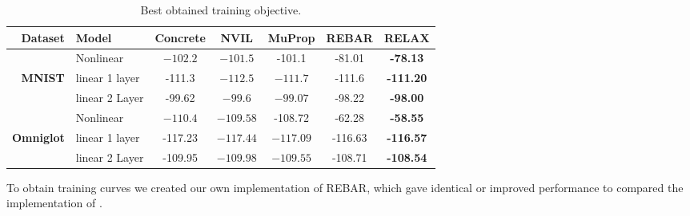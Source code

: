 \documentclass{article}
\newcommand{\E}{\mathbb{E}}
\newcommand{\PT}{\frac{\partial}{\partial \theta}}
\newcommand{\PP}[1]{\frac{\partial}{\partial #1}}
\begin{document}
\begin{table}[h]
\centering
\begin{tabular}{r l | c c c c c} 
Dataset & Model & Concrete & NVIL & MuProp  & REBAR & RELAX\\\midrule 
               & Nonlinear & $-102.2$ & $-101.5$ & -101.1  &  -81.01 &  \textbf{-78.13} \\
\textbf{MNIST} & linear 1 layer  &-111.3 & $-112.5$ & $-111.7$  & -111.6 & \textbf{-111.20} \\ 
               & linear 2 Layer  &-99.62 & $-99.6$ & $-99.07$   & -98.22 & \textbf{-98.00} \\
\midrule
               & Nonlinear  & $-110.4$  & $-109.58$ & -108.72  & -62.28 & \textbf{-58.55} \\
\textbf{Omniglot} & linear 1 layer &-117.23 & $-117.44$ & $-117.09$   & -116.63 & \textbf{-116.57} \\ 
                  & linear 2 Layer &-109.95 & $-109.98$ & $-109.55$  & -108.71 & \textbf{-108.54}
\end{tabular}
\caption{Best obtained training objective.}
\label{tab:vae tr}
\end{table}





To obtain training curves we created our own implementation of REBAR, which gave identical or improved performance to compared the implementation of \citet{tucker2017rebar}.
\end{document}
